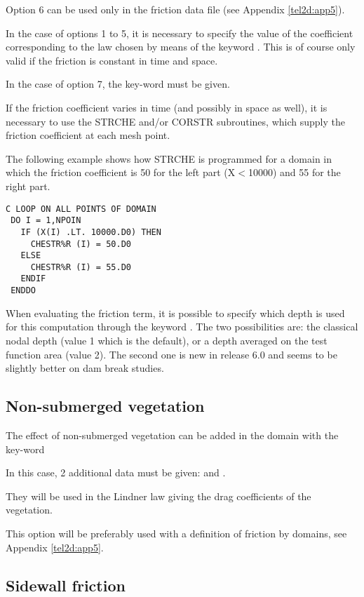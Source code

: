  Option 6 can be used only in the friction data file (see Appendix \ref{tel2d:app5}).

 In the case of options 1 to 5, it is necessary to specify the value of the coefficient corresponding to the law chosen by means of the keyword . This is of course only valid if the friction is constant in time and space.

 In the case of option 7, the key-word  must be given.

 If the friction coefficient varies in time (and possibly in space as well), it is necessary to use the STRCHE and/or CORSTR subroutines, which supply the friction coefficient at each mesh point.

 The following example shows how STRCHE is programmed for a domain in which the friction coefficient is 50 for the left part (X$<$10000) and 55 for the right part.
\begin{lstlisting}[language=TelFortran]
C LOOP ON ALL POINTS OF DOMAIN
 DO I = 1,NPOIN
   IF (X(I) .LT. 10000.D0) THEN
     CHESTR%R (I) = 50.D0
   ELSE
     CHESTR%R (I) = 55.D0
   ENDIF
 ENDDO
\end{lstlisting}
 When evaluating the friction term, it is possible to specify which depth is used for this computation through the keyword . The two possibilities are: the classical nodal depth (value 1 which is the default), or a depth averaged on the test function area (value 2). The second one is new in release 6.0 and seems to be slightly better on dam break studies.


\subsection{ Non-submerged vegetation}

 The effect of non-submerged vegetation can be added in the domain with the key-word 

 In this case, 2 additional data must be given: and .

 They will be used in the Lindner law giving the drag coefficients of the vegetation.

 This option will be preferably used with a definition of friction by domains, see Appendix \ref{tel2d:app5}.


\subsection{ Sidewall friction}

